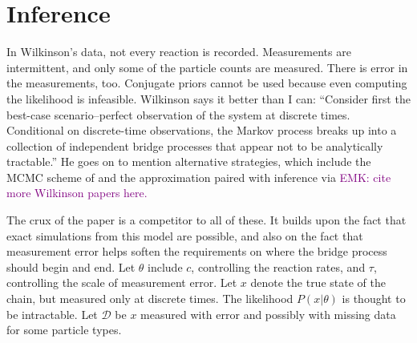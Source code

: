 \documentclass{article}
\newcommand\EMK[1]{\textcolor{purple}{EMK: #1}}
\begin{document}
\section{Inference}

In Wilkinson's data, not every reaction is recorded. Measurements are intermittent, and only some of the particle counts are measured. There is error in the measurements, too. Conjugate priors cannot be used because even computing the likelihood is infeasible. Wilkinson says it better than I can: ``Consider first the best-case scenario--perfect observation of the system at discrete times. Conditional on discrete-time observations, the Markov process breaks up into a collection of independent bridge processes that appear not to be analytically tractable.'' He goes on to mention alternative strategies, which include the MCMC scheme of \cite{Boys2008} and the approximation \cite{gillespie_CLE_2000} paired with inference via \EMK{cite more Wilkinson papers here.}


The crux of the paper is a competitor to all of these. It builds upon the fact that exact simulations from this model are possible, and also on the fact that measurement error helps soften the requirements on where the bridge process should begin and end. Let $\theta$ include $c$, controlling the reaction rates, and $\tau$, controlling the scale of measurement error. Let $x$ denote the true state of the chain, but measured only at discrete times. The likelihood $P(x|\theta)$ is thought to be intractable. Let $\mathcal{D}$ be $x$ measured with error and possibly with missing data for some particle types. 
\end{document}

